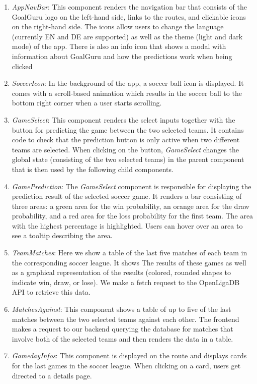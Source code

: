 \documentclass[conference,a4paper,flushend]{cs-techrep}
\begin{document}
\begin{enumerate}
 
\item \textit{AppNavBar}: This component renders the navigation bar that consists of the GoalGuru logo on the left-hand side, links to the routes, and clickable icons on the right-hand side. The icons allow users to change the language (currently EN and DE are supported) as well as the theme (light and dark mode) of the app. There is also an info icon that shows a modal with information about GoalGuru and how the predictions work when being clicked
\item \textit{SoccerIcon}: In the background of the app, a soccer ball icon is displayed. It comes with a scroll-based animation which results in the soccer ball  to the bottom right corner when a user starts scrolling.
\item \textit{GameSelect}: This component renders the select inputs together with the button for predicting the game between the two selected teams. It contains code to check that the prediction button is only active when two different teams are selected. When clicking on the button, \textit{GameSelect} changes the global state (consisting of the two selected teams) in the parent component that is then used by the following child components.
\item \textit{GamePrediction}: The \textit{GameSelect} component is responsible for displaying the prediction result of the selected soccer game. It renders a bar consisting of three areas: a green area for the win probability, an orange area for the draw probability, and a red area for the loss probability for the first team. The area with the highest percentage is highlighted. Users can hover over an area to see a tooltip describing the area.
\item \textit{TeamMatches}: Here we show a table of the last five matches of each team in the corresponding soccer league. It shows The results of these games as well as a graphical representation of the results (colored, rounded shapes to indicate win, draw, or lose). We make a fetch request to the OpenLigaDB API to retrieve this data.
\item \textit{MatchesAgainst}: This component shows a table of up to five of the last matches between the two selected teams against each other. The frontend makes a request to our backend querying the database for matches that involve both of the selected teams and then renders the data in a table.
\item \textit{GamedayInfos}: This component is displayed on the  route and displays cards for the last games in the soccer league. When clicking on a card, users get directed to a details page.
\end{enumerate}
\end{document}
